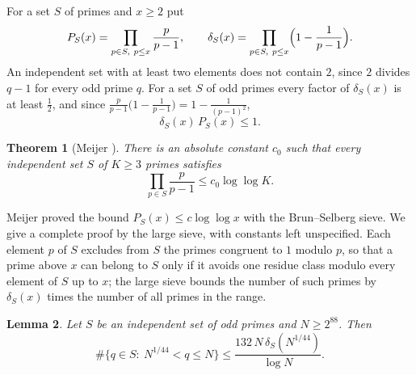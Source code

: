 \documentclass[11pt,reqno]{amsart}
\numberwithin{equation}{section}
\theoremstyle{plain}
\newtheorem{theorem}{Theorem}[section]
\newtheorem{lemma}[theorem]{Lemma}
\theoremstyle{definition}
\theoremstyle{remark}
\begin{document}
For a set $S$ of primes and $x\ge2$ put
\[
  P_S(x)=\prod_{p\in S,\ p\le x}\frac p{p-1},\qquad
  \delta_S(x)=\prod_{p\in S,\ p\le x}\Bigl(1-\frac1{p-1}\Bigr).
\]
An independent set with at least two elements does not contain $2$,
since $2$ divides $q-1$ for every odd prime $q$. For a set $S$ of odd
primes every factor of $\delta_S(x)$ is at least $\frac12$, and since
$\frac p{p-1}\bigl(1-\frac1{p-1}\bigr)=1-\frac1{(p-1)^2}$,
\begin{equation}\label{eq:deltaP}
  \delta_S(x)\,P_S(x)\le1 .
\end{equation}

\begin{theorem}[Meijer \cite{Mei74}]\label{thm:sieve}
There is an absolute constant $c_0$ such that every independent set
$S$ of $K\ge3$ primes satisfies
\[
  \prod_{p\in S}\frac p{p-1}\le c_0\log\log K .
\]
\end{theorem}

Meijer proved the bound $P_S(x)\le c\log\log x$ with the
Brun--Selberg sieve. We give a complete proof by the large sieve, with
constants left unspecified. Each element $p$ of $S$ excludes
from $S$ the primes congruent to $1$ modulo $p$, so that a prime above
$x$ can belong to $S$ only if it avoids one residue class modulo every
element of $S$ up to $x$; the large sieve bounds the number of such
primes by $\delta_S(x)$ times the number of all primes in the range.

\begin{lemma}\label{lem:sievestep}
Let $S$ be an independent set of odd primes and $N\ge2^{88}$. Then
\[
  \#\{q\in S:\ N^{1/44}<q\le N\}\le\frac{132\,N\,\delta_S(N^{1/44})}{\log N}.
\]
\end{lemma}
\end{document}
